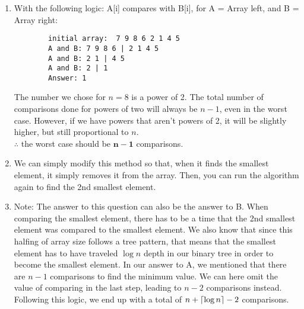 \documentclass[
	12pt
]{fphw}
\DeclarePairedDelimiter\ceil{\lceil}{\rceil}
\begin{document}
\begin{enumerate}
	\item With the following logic: A[i] compares with B[i], for A = Array left, and B = Array right:
	\begin{verbatim}
		initial array:	7 9 8 6 2 1 4 5
		A and B: 7 9 8 6 | 2 1 4 5
		A and B: 2 1 | 4 5
		A and B: 2 | 1
		Answer: 1
	\end{verbatim}
	The number we chose for $n = 8$ is a power of 2. The total number of comparisons done for powers of two will always be $n - 1$, even in the worst case. However, if we have powers that aren't powers of 2, it will be slightly higher, but still proportional to $n$.\\
	$\therefore$ the worst case should be $\boxed{\mathbf{n - 1}}$ comparisons.
	\item We can simply modify this method so that, when it finds the smallest element, it simply removes it from the array. Then, you can run the algorithm again to find the 2nd smallest element.
	\item Note: The answer to this question can also be the answer to B. When comparing the smallest element, there has to be a time that the 2nd smallest element was compared to the smallest element. We also know that since this halfing of array size follows a tree pattern, that means that the smallest element has to have traveled $\log n$ depth in our binary tree in order to become the smallest element. In our answer to A, we mentioned that there are $n-1$ comparisons to find the minimum value. We can here omit the value of comparing in the last step, leading to $n - 2$ comparisons instead. Following this logic, we end up with a total of $n + \ceil{\log n} - 2$ comparisons.
\end{enumerate}

\end{document}
